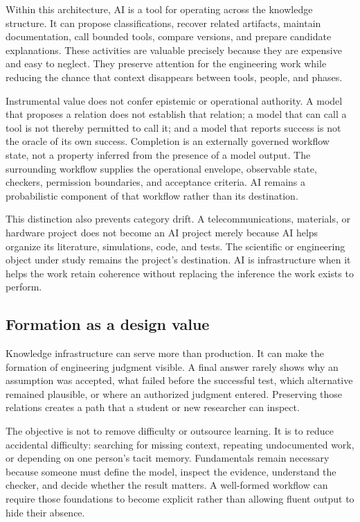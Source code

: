 \documentclass[10pt,a4paper]{article}
\begin{document}
Within this architecture, AI is a tool for operating across the knowledge structure. It can propose classifications, recover related artifacts, maintain documentation, call bounded tools, compare versions, and prepare candidate explanations. These activities are valuable precisely because they are expensive and easy to neglect. They preserve attention for the engineering work while reducing the chance that context disappears between tools, people, and phases.

Instrumental value does not confer epistemic or operational authority. A model that proposes a relation does not establish that relation; a model that can call a tool is not thereby permitted to call it; and a model that reports success is not the oracle of its own success. Completion is an externally governed workflow state, not a property inferred from the presence of a model output. The surrounding workflow supplies the operational envelope, observable state, checkers, permission boundaries, and acceptance criteria. AI remains a probabilistic component of that workflow rather than its destination.

This distinction also prevents category drift. A telecommunications, materials, or hardware project does not become an AI project merely because AI helps organize its literature, simulations, code, and tests. The scientific or engineering object under study remains the project's destination. AI is infrastructure when it helps the work retain coherence without replacing the inference the work exists to perform.

\subsection{Formation as a design value}

Knowledge infrastructure can serve more than production. It can make the formation of engineering judgment visible. A final answer rarely shows why an assumption was accepted, what failed before the successful test, which alternative remained plausible, or where an authorized judgment entered. Preserving those relations creates a path that a student or new researcher can inspect.

The objective is not to remove difficulty or outsource learning. It is to reduce accidental difficulty: searching for missing context, repeating undocumented work, or depending on one person's tacit memory. Fundamentals remain necessary because someone must define the model, inspect the evidence, understand the checker, and decide whether the result matters. A well-formed workflow can require those foundations to become explicit rather than allowing fluent output to hide their absence.
\end{document}
